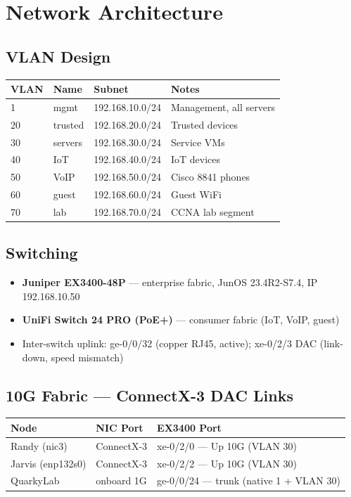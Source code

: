 \documentclass[11pt,letterpaper]{article}
\begin{document}
\section{Network Architecture}

\subsection{VLAN Design}

\begin{tabular}{llll}
\toprule
\textbf{VLAN} & \textbf{Name} & \textbf{Subnet} & \textbf{Notes} \\
\midrule
1   & mgmt    & 192.168.10.0/24 & Management, all servers \\
20  & trusted & 192.168.20.0/24 & Trusted devices \\
30  & servers & 192.168.30.0/24 & Service VMs \\
40  & IoT     & 192.168.40.0/24 & IoT devices \\
50  & VoIP    & 192.168.50.0/24 & Cisco 8841 phones \\
60  & guest   & 192.168.60.0/24 & Guest WiFi \\
70  & lab     & 192.168.70.0/24 & CCNA lab segment \\
\bottomrule
\end{tabular}

\subsection{Switching}

\begin{itemize}
  \item \textbf{Juniper EX3400-48P} — enterprise fabric, JunOS 23.4R2-S7.4, IP 192.168.10.50
  \item \textbf{UniFi Switch 24 PRO (PoE+)} — consumer fabric (IoT, VoIP, guest)
  \item Inter-switch uplink: ge-0/0/32 (copper RJ45, active); xe-0/2/3 DAC (link-down, speed mismatch)
\end{itemize}

\subsection{10G Fabric — ConnectX-3 DAC Links}

\begin{tabular}{lll}
\toprule
\textbf{Node} & \textbf{NIC Port} & \textbf{EX3400 Port} \\
\midrule
Randy (nic3)      & ConnectX-3 & xe-0/2/0 — Up 10G (VLAN 30) \\
Jarvis (enp132s0) & ConnectX-3 & xe-0/2/2 — Up 10G (VLAN 30) \\
QuarkyLab         & onboard 1G & ge-0/0/24 — trunk (native 1 + VLAN 30) \\
\bottomrule
\end{tabular}
\end{document}
